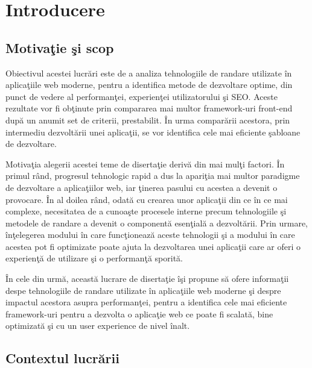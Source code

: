 \documentclass[12pt, a4paper]{report}
\begin{document}
\tableofcontents{}
\listoffigures{}

\newpage{}

\chapter{Introducere}

\setcounter{page}{1}


\section{Motiva\c tie \c si scop}

Obiectivul acestei lucr\u ari este de a analiza tehnologiile de randare utilizate \^in aplica\c tiile web moderne, pentru a identifica metode de dezvoltare optime, din punct de vedere al performan\c tei, experien\c tei utilizatorului \c si SEO. Aceste rezultate vor fi ob\c tinute prin compararea mai multor framework-uri front-end dup\u a un anumit set de criterii, prestabilit. \^In urma compar\u arii acestora, prin intermediu dezvolt\u arii unei aplica\c tii, se vor identifica cele mai eficiente \c sabloane de dezvoltare.

Motiva\c tia alegerii acestei teme de diserta\c tie deriv\u a din mai mul\c ti factori. \^In primul r\^and, progresul tehnologic rapid a dus la apari\c tia mai multor paradigme de dezvoltare a aplica\c tiilor web, iar \c tinerea pasului cu acestea a devenit o provocare. \^In al doilea r\^and, odat\u a cu crearea unor aplica\c tii din ce \^in ce mai complexe, necesitatea de a cunoa\c ste procesele interne precum tehnologiile \c si metodele de randare a devenit o component\u a esen\c tial\u a a dezvolt\u arii. Prin urmare, \^in\c telegerea modului \^in care func\c tioneaz\u a aceste tehnologii \c si a modului \^in care acestea pot fi optimizate poate ajuta la dezvoltarea unei aplica\c tii care ar oferi o experien\c t\u a de utilizare \c si o performan\c t\u a sporit\u a.

\^In cele din urm\u a, aceast\u a lucrare de diserta\c tie \^i\c si propune s\u a ofere informa\c tii despe tehnologiile de randare utilizate \^in aplica\c tiile web moderne \c si despre impactul acestora asupra performan\c tei, pentru a identifica cele mai eficiente framework-uri pentru a dezvolta o aplica\c tie web ce poate fi scalat\u a, bine optimizat\u a \c si cu un user experience de nivel \^inalt.


\section{Contextul lucr\u arii}
\end{document}
